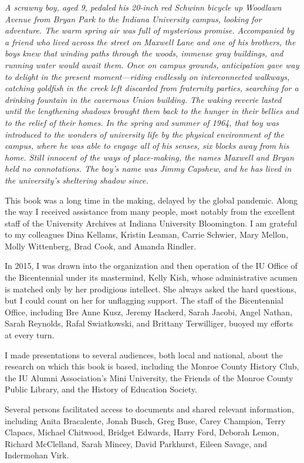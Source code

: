 \documentclass[
  letterpaper,
]{scrbook}
\begin{document}
\emph{A scrawny boy, aged 9, pedaled his 20-inch red Schwinn bicycle up
Woodlawn Avenue from Bryan Park to the Indiana University campus,
looking for adventure. The warm spring air was full of mysterious
promise. Accompanied by a friend who lived across the street on Maxwell
Lane and one of his brothers, the boys knew that winding paths through
the woods, immense gray buildings, and running water would await them.
Once on campus grounds, anticipation gave way to delight in the present
moment---riding endlessly on interconnected walkways, catching goldfish
in the creek left discarded from fraternity parties, searching for a
drinking fountain in the cavernous Union building. The waking reverie
lasted until the lengthening shadows brought them back to the hunger in
their bellies and to the relief of their homes. In the spring and summer
of 1964, that boy was introduced to the wonders of university life by
the physical environment of the campus, where he was able to engage all
of his senses, six blocks away from his home. Still innocent of the ways
of place-making, the names Maxwell and Bryan held no connotations. The
boy's name was Jimmy Capshew, and he has lived in the university's
sheltering shadow since.}

This book was a long time in the making, delayed by the global pandemic.
Along the way I received assistance from many people, most notably from
the excellent staff of the University Archives at Indiana University
Bloomington. I am grateful to my colleagues Dina Kellams, Kristin
Leaman, Carrie Schwier, Mary Mellon, Molly Wittenberg, Brad Cook, and
Amanda Rindler.

In 2015, I was drawn into the organization and then operation of the IU
Office of the Bicentennial under its mastermind, Kelly Kish, whose
administrative acumen is matched only by her prodigious intellect. She
always asked the hard questions, but I could count on her for unflagging
support. The staff of the Bicentennial Office, including Bre Anne Kusz,
Jeremy Hackerd, Sarah Jacobi, Angel Nathan, Sarah Reynolds, Rafal
Swiatkowski, and Brittany Terwilliger, buoyed my efforts at every turn.

I made presentations to several audiences, both local and national,
about the research on which this book is based, including the Monroe
County History Club, the IU Alumni Association's Mini University, the
Friends of the Monroe County Public Library, and the History of
Education Society.

Several persons facilitated access to documents and shared relevant
information, including Anita Bracalente, Jonah Busch, Greg Buse, Carey
Champion, Terry Clapacs, Michael Chitwood, Bridget Edwards, Harry Ford,
Deborah Lemon, Richard McClelland, Sarah Mincey, David Parkhurst, Eileen
Savage, and Indermohan Virk.
\end{document}
